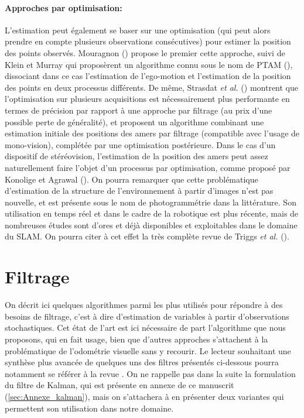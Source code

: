 \paragraph{Approches par optimisation:\\}
L'estimation peut également se baser sur une optimisation (qui peut alors prendre en compte plusieurs observations consécutives) pour estimer la position des points observés. Mouragnon (\cite{Mouragnon2006}) propose le premier cette approche, suivi de Klein et Murray qui proposèrent un algorithme connu sous le nom de PTAM (\cite{Klein2007}), dissociant dans ce cas l'estimation de l’ego-motion et l'estimation de la position des points en deux processus différents. De même, Strasdat \textit{et al.} (\cite{Strasdat}) montrent que l'optimisation sur plusieurs acquisitions est nécessairement plus performante en termes de précision par rapport à une approche par filtrage (au prix d'une possible perte de généralité), et proposent un algorithme combinant une estimation initiale des positions des amers par filtrage (compatible avec l'usage de mono-vision), complétée par une optimisation postérieure. Dans le cas d'un dispositif de stéréovision, l'estimation de la position des amers peut assez naturellement faire l'objet d'un processus par optimisation, comme proposé par Konolige et Agrawal (\cite{Konolige2008}). On pourra remarquer que cette problématique d'estimation de la structure de l'environnement à partir d'images n'est pas nouvelle, et est présente sous le nom de photogrammétrie dans la littérature. Son utilisation en temps réel et dans le cadre de la robotique est plus récente, mais de nombreuses études sont d'ores et déjà disponibles et exploitables dans le domaine du SLAM. On pourra citer à cet effet la très complète revue de Triggs \textit{et al.} (\cite{Triggs2000}).

\section{Filtrage}  \label{sec:ch4_filtrage}
On décrit ici quelques algorithmes parmi les plus utilisés pour répondre à des besoins de filtrage, c'est à dire d'estimation de variables à partir d'observations stochastiques. Cet état de l'art est ici nécessaire de part l'algorithme que nous proposons, qui en fait usage, bien que d'autres approches s'attachent à la problématique de l'odométrie visuelle sans y recourir. Le lecteur souhaitant une synthèse plus avancée de quelques uns des filtres présentés ci-dessous pourra notamment se référer à la revue \cite{Chen2003}. On ne rappelle pas dans la suite la formulation du filtre de Kalman, qui est présente en annexe de ce manuscrit (\ref{sec:Annexe_kalman}), mais on s'attachera à en présenter deux variantes qui permettent son utilisation dans notre domaine.

